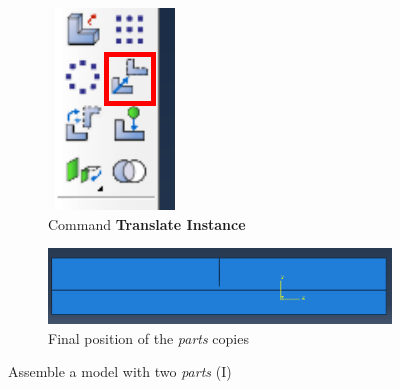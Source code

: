 \begin{itemize}
\begin{figure}[!h]
    \begin{subfigure}[!h]{0.15\textwidth}
      \includegraphics[width=\textwidth]{./body/images/ayu02.pdf}
      \caption{Command \textbf{Translate Instance}}
      \label{ayu02}
    \end{subfigure}%
    \begin{subfigure}[!h]{0.82\textwidth}
      \includegraphics[width=\textwidth]{./body/images/ayu03}
      \caption{Final position of the \textit{parts} copies}
      \label{ayu03}
    \end{subfigure}%
    \caption{Assemble a model with two \textit{parts} (I)}
  \end{figure}


\end{itemize}
